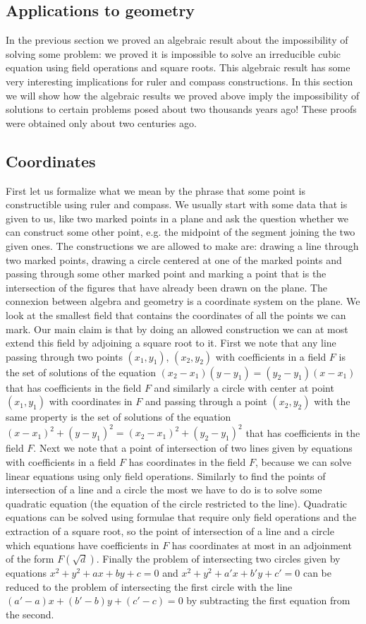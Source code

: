\subsection{Applications to geometry}
In the previous section we proved an algebraic result about the impossibility of solving some problem: we proved it is impossible to solve an irreducible cubic equation using field operations and square roots.
This algebraic result has some very interesting implications for ruler and compass constructions. In this section we will show how the algebraic results we proved above imply the impossibility of solutions to certain problems posed about two thousands years ago! These proofs were obtained only about two centuries ago.
\subsection{Coordinates}
First let us formalize what we mean by the phrase that some point is constructible using ruler and compass. We usually start with some data that is given to us, like two marked points in a plane and ask the question whether we can construct some other point, e.g. the midpoint of the segment joining the two given ones. The constructions we are allowed to make are: drawing a line through two marked points, drawing a circle centered at one of the marked points and passing through some other marked point and marking a point that is the intersection of the figures that have already been drawn on the plane.
The connexion between algebra and geometry is a coordinate system on the plane. We look at the smallest field that contains the coordinates of all the points we can mark.
Our main claim is that by doing an allowed construction we can at most extend this field by adjoining a square root to it. First we note that any line passing through two points $(x_1,y_1)$, $(x_2,y_2)$ with coefficients in a field $F$ is the set of solutions of the equation $(x_2-x_1)(y-y_1)=(y_2-y_1)(x-x_1)$ that has coefficients in the field $F$ and similarly a circle with center at point $(x_1,y_1)$ with coordinates in $F$ and passing through a point $(x_2,y_2)$ with the same property is the set of solutions of the equation $(x-x_1)^2+(y-y_1)^2=(x_2-x_1)^2+(y_2-y_1)^2$ that has coefficients in the field $F$. Next we note that a point of intersection of two lines given by equations with coefficients in a field $F$ has coordinates in the field $F$, because we can solve linear equations using only field operations. Similarly to find the points of intersection of a line and a circle the most we have to do is to solve some quadratic equation (the equation of the circle restricted to the line). Quadratic equations can be solved using formulae that require only field operations and the extraction of a square root, so the point of intersection of a line and a circle which equations have coefficients in $F$ has coordinates at most in an adjoinment of the form $F(\sqrt{d})$. Finally the problem of intersecting two circles given by equations $x^2+y^2+a x + b y + c=0$ and $x^2+y^2+a' x + b' y + c'=0$ can be reduced to the problem of intersecting the first circle with the line $(a'-a)x+(b'-b)y+(c'-c)=0$ by subtracting the first equation from the second.
